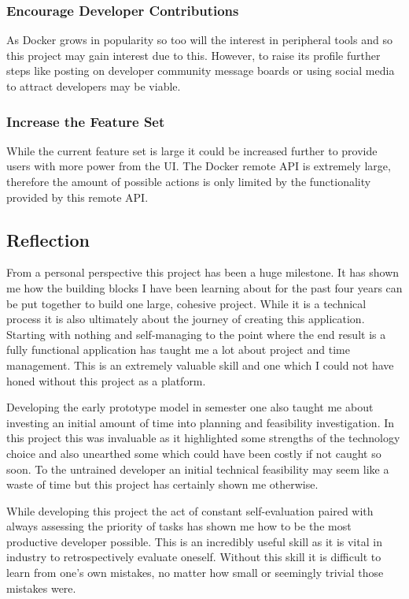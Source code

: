 \subsubsection{Encourage Developer Contributions}
As Docker grows in popularity so too will the interest in peripheral tools and so this project may gain interest due to this. However, to raise its profile further steps like posting on developer community message boards or using social media to attract developers may be viable.

\subsubsection{Increase the Feature Set}
While the current feature set is large it could be increased further to provide users with more power from the UI. The Docker remote API is extremely large, therefore the amount of possible actions is only limited by the functionality provided by this remote API.

\subsection{Reflection}
From a personal perspective this project has been a huge milestone. It has shown me how the building blocks I have been learning about for the past four years can be put together to build one large, cohesive project. While it is a technical process it is also ultimately about the journey of creating this application. Starting with nothing and self-managing to the point where the end result is a fully functional application has taught me a lot about project and time management. This is an extremely valuable skill and one which I could not have honed without this project as a platform.

Developing the early prototype model in semester one also taught me about investing an initial amount of time into planning and feasibility investigation. In this project this was invaluable as it highlighted some strengths of the technology choice and also unearthed some which could have been costly if not caught so soon. To the untrained developer an initial technical feasibility may seem like a waste of time but this project has certainly shown me otherwise. 

While developing this project the act of constant self-evaluation paired with always assessing the priority of tasks has shown me how to be the most productive developer possible. This is an incredibly useful skill as it is vital in industry to retrospectively evaluate oneself. Without this skill it is difficult to learn from one's own mistakes, no matter how small or seemingly trivial those mistakes were.

